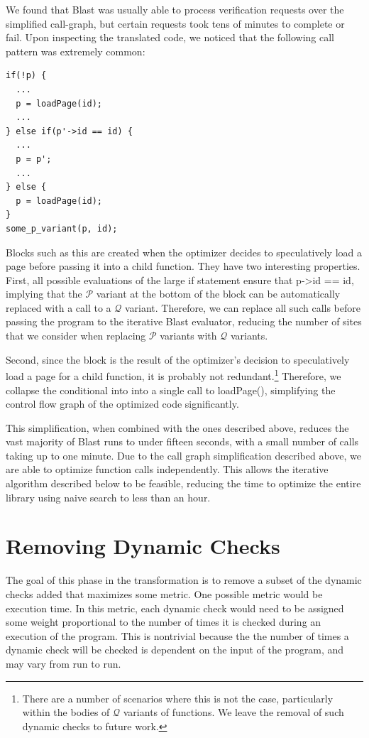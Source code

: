 \documentclass[10pt,letterpaper,twocolumn,english]{article}
\newcommand{\pin}{loadPage()\xspace}
\newcommand{\fP}{{$\mathcal P$}\xspace}
\newcommand{\fQ}{{$\mathcal Q$}\xspace}
\begin{document}
We found that Blast was usually able to process verification requests
over the simplified call-graph, but certain requests took tens of
minutes to complete or fail.  Upon inspecting the translated code, we
noticed that the following call pattern was extremely common:

\begin{verbatim}
if(!p) { 
  ...
  p = loadPage(id);
  ...
} else if(p'->id == id) {
  ...
  p = p';
  ...
} else {
  p = loadPage(id);
}
some_p_variant(p, id);
\end{verbatim}

Blocks such as this are created when the optimizer decides to
speculatively load a page before passing it into a child function.
They have two interesting properties.  First, all possible evaluations
of the large if statement ensure that p->id == id, implying that the
\fP variant at the bottom of the block can be automatically replaced
with a call to a \fQ variant.  Therefore, we can replace all such calls
before passing the program to the iterative Blast evaluator, reducing
the number of sites that we consider when replacing \fP variants with
\fQ variants.

Second, since the block is the result of the optimizer's decision to
speculatively load a page for a child function, it is probably not
redundant.\footnote{There are a number of scenarios where this is not
the case, particularly within the bodies of \fQ variants of functions.
We leave the removal of such dynamic checks to future work.}
Therefore, we collapse the conditional into into a single call to
\pin, simplifying the control flow graph of the optimized code
significantly.  

This simplification, when combined with the ones described above,
reduces the vast majority of Blast runs to under fifteen seconds, with
a small number of calls taking up to one minute.  Due to the call graph
simplification described above, we are able to optimize function calls
independently.  This allows the iterative algorithm described below to
be feasible, reducing the time to optimize the entire library using
naive search to less than an hour.

\section{Removing Dynamic Checks}
\label{delta}
The goal of this phase in the transformation is to remove a subset of
the dynamic checks added that maximizes some metric.  One possible
metric would be execution time.  In this metric, each dynamic check
would need to be assigned some weight proportional to the number of
times it is checked during an execution of the program.  This is
nontrivial because the the number of times a dynamic check will be
checked is dependent on the input of the program, and may vary from run
to run. 
\end{document}
